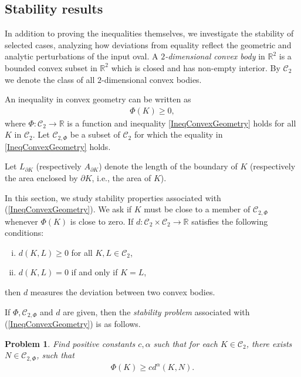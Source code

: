 \documentclass{amsart}
\newtheorem{prob}[thm]{Problem}
\theoremstyle{definition}
\numberwithin{equation}{section}
\begin{document}
   \subsection{Stability results}\label{ssec52}
In addition to proving the inequalities themselves, we investigate the stability of selected cases, analyzing how deviations from equality reflect the geometric and analytic perturbations of the input oval.  
A \textit{$2$-dimensional convex body} in $\mathbb{R}^2$ is a bounded convex subset in $\mathbb{R}^2$ which is closed and has non-empty interior. By $\mathcal{C}_2$ we denote the class of all $2$-dimensional convex bodies.

An inequality in convex geometry can be written as
\begin{align}\label{IneqConvexGeometry} 
\Phi(K)\geqslant 0,
\end{align}
where $\Phi:\mathcal{C}_2\to\mathbb{R}$ is a function and inequality \eqref{IneqConvexGeometry} holds for all $K$ in $\mathcal{C}_2$. Let $\mathcal{C}_{2,{\Phi}}$ be a subset of $\mathcal{C}_2$ for which the equality in \eqref{IneqConvexGeometry} holds. 

Let $L_{\partial K}$ (respectively $A_{\partial K}$) denote the length of the boundary of $K$ (respectively the area enclosed by $\partial K$, i.e., the area of $K$).

In this section, we study stability properties associated with (\ref{IneqConvexGeometry}). We ask if $K$ must be close to a member of $\mathcal{C}_{2,{\Phi}}$ whenever $\Phi(K)$ is close to zero. If $d:\mathcal{C}_2\times\mathcal{C}_2\to\mathbb{R}$ satisfies the following conditions:
\begin{enumerate}[(i)]
\item $d(K,L)\geqslant 0$ for all $K,L\in\mathcal{C}_2$,
\item $d(K,L)=0$ if and only if $K=L$,
\end{enumerate}
then $d$ measures the deviation between two convex bodies.

If $\Phi, \mathcal{C}_{2,{\Phi}}$ and $d$ are given, then the \textit{stability problem} associated with (\ref{IneqConvexGeometry}) is as follows.

\begin{prob}Find positive constants $c,\alpha$ such that for each $K\in\mathcal{C}_2$, there exists $N\in \mathcal{C}_{2,{\Phi}}$, such that 
\begin{align}\label{StabilityIneq}
\Phi(K)\geqslant cd^{\alpha}(K,N).
\end{align}
\end{prob}
\end{document}
